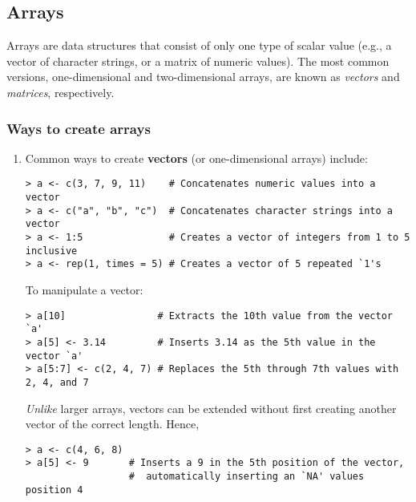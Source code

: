 \subsection{Arrays}

Arrays are data structures that consist of only one type of scalar
value (e.g., a vector of character strings, or a matrix of numeric
values).  The most common versions, one-dimensional and
two-dimensional arrays, are known as \emph{vectors} and
\emph{matrices}, respectively.  

\subsubsection*{Ways to create arrays}
\begin{enumerate}
\item Common ways to create {\bf vectors} (or one-dimensional arrays)
include:  
\begin{verbatim}
> a <- c(3, 7, 9, 11)    # Concatenates numeric values into a vector
> a <- c("a", "b", "c")  # Concatenates character strings into a vector
> a <- 1:5               # Creates a vector of integers from 1 to 5 inclusive  
> a <- rep(1, times = 5) # Creates a vector of 5 repeated `1's
\end{verbatim}
To manipulate a vector:  
\begin{verbatim}
> a[10]                # Extracts the 10th value from the vector `a'
> a[5] <- 3.14         # Inserts 3.14 as the 5th value in the vector `a'
> a[5:7] <- c(2, 4, 7) # Replaces the 5th through 7th values with 2, 4, and 7
\end{verbatim}
\emph{Unlike} larger arrays, vectors can be extended without first
creating another vector of the correct length.  Hence, 
\begin{verbatim}
> a <- c(4, 6, 8) 
> a[5] <- 9       # Inserts a 9 in the 5th position of the vector,
                  #  automatically inserting an `NA' values position 4 
\end{verbatim}


\end{enumerate}
